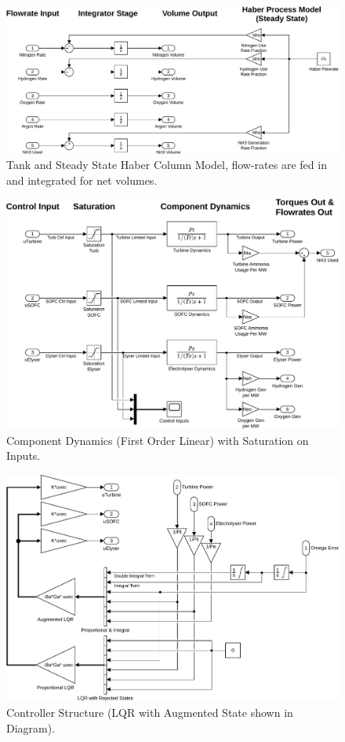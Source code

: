 \begin{figure}[p]
\centering
        \includegraphics[scale=0.65]{images/plant2/tank.pdf}
    \caption{Tank and Steady State Haber Column Model, flow-rates are fed in and integrated for net volumes.}
        \label{fig:tank}
\end{figure}
\begin{figure}[p]
\centering
        \includegraphics[scale=0.7]{images/plant2/comp.pdf}
    \caption{Component Dynamics (First Order Linear) with Saturation on Inputs.}
        \label{fig:comp}
\end{figure}
\begin{figure}[p]
\centering
        \includegraphics[scale=0.7]{images/plant2/ctrl.pdf}
    \caption{Controller Structure (LQR with Augmented State shown in Diagram).}
        \label{fig:ctrl}
\end{figure}
